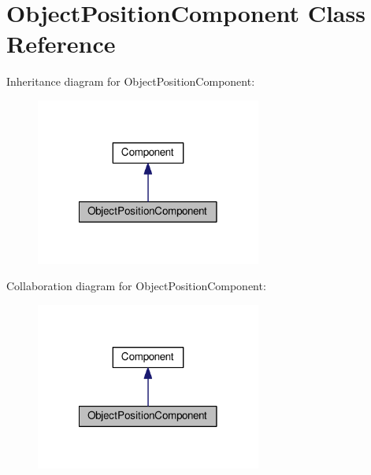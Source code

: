 \hypertarget{classObjectPositionComponent}{\section{Object\-Position\-Component Class Reference}
\label{classObjectPositionComponent}
}


Inheritance diagram for Object\-Position\-Component\-:
\nopagebreak
\begin{figure}[H]
\begin{center}
\leavevmode
\includegraphics[width=210pt]{classObjectPositionComponent__inherit__graph}
\end{center}
\end{figure}


Collaboration diagram for Object\-Position\-Component\-:
\nopagebreak
\begin{figure}[H]
\begin{center}
\leavevmode
\includegraphics[width=210pt]{classObjectPositionComponent__coll__graph}
\end{center}
\end{figure}
